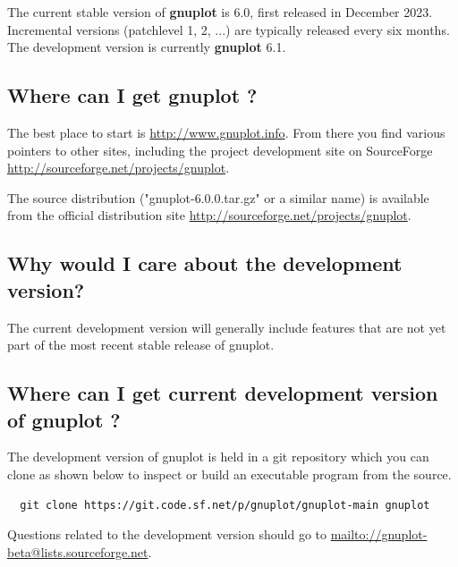\documentclass[letter,11pt]{article}
\def\http#1{{\small\href{http://#1}{\url{http://#1}}}}
\def\mailto#1{{\small\href{mailto://#1}{\url{mailto://#1}}}}
\newcommand{\mailto}[1]%
            {\htmladdnormallink{\latex{\url{<#1>}}\html{\textit{#1}}}%
                {mailto:#1}%
            }
\newcommand{\http}[1]%
            {\htmladdnormallink{\latex{\url{http://#1}}%
                    \html{\textit{http://#1}}}%
                {http://#1}%
            }
\newcommand{\gnuplot}{\textbf{gnuplot }}
\begin{document}
{The current stable version of \gnuplot is 6.0, first released in December 2023.
Incremental versions (patchlevel 1, 2, ...) are typically released every six months.
The development version is currently \gnuplot 6.1.

\subsection{Where can I get \gnuplot?}
\label{where-get-gnuplot}

The best place to start is \http{www.gnuplot.info}. From there
you find various pointers to other sites, including the project
development site on SourceForge \http{sourceforge.net/projects/gnuplot}.

The source distribution ("gnuplot-6.0.0.tar.gz" or a similar name) is
available from the official distribution site \http{sourceforge.net/projects/gnuplot}.

\subsection{Why would I care about the development version?}

The current development version will generally include features that are
not yet part of the most recent stable release of gnuplot.

\subsection{Where can I get current development version of \gnuplot?}

The development version of gnuplot is held in a git repository which you
can clone as shown below to inspect or build an executable program
from the source.

\scriptsize
\begin{verbatim}
  git clone https://git.code.sf.net/p/gnuplot/gnuplot-main gnuplot
\end{verbatim}
\normalsize

Questions related to the development version should go to
\mailto{gnuplot-beta@lists.sourceforge.net}.


}
\end{document}
